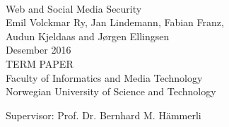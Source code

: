 
\thispagestyle{empty}
\mbox{}\\[6pc]
\begin{center}
\Huge{Web and Social Media Security}\\[2pc]

\Large{Emil Volckmar Ry, Jan Lindemann, Fabian Franz, \\ Audun Kjeldaas and Jørgen Ellingsen}\\[1pc]
\large{Desember 2016}\\[2pc]

TERM PAPER\\
Faculty of Informatics and Media Technology \\
Norwegian University of Science and Technology
\end{center}
\vfill

\noindent Supervisor: Prof. Dr. Bernhard M. Hämmerli

